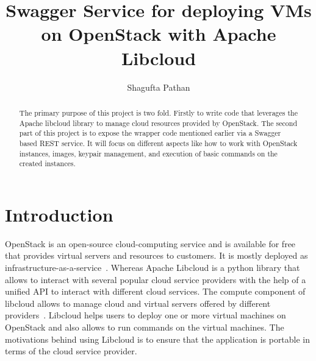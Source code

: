 
\title{Swagger Service for deploying VMs on OpenStack with Apache Libcloud}


\author{Shagufta Pathan}

\renewcommand{\shortauthors}{Shagufta}


\begin{abstract}
The primary purpose of this project is two fold. Firstly to write code that
leverages the Apache libcloud library to manage cloud resources provided by
OpenStack. The second part of this project is to expose the wrapper code
mentioned earlier via a Swagger based REST service. It will focus on different
aspects like how to work with OpenStack instances, images, keypair management,
and execution of basic commands on the created instances.
\end{abstract}


\maketitle

\section{Introduction}
OpenStack is an open-source cloud-computing service and is available for free
that provides virtual servers and resources to customers. It is mostly deployed
as infrastructure-as-a-service~\cite{hid-sp18-516-www-openstack}. Whereas Apache
Libcloud is a python library that allows to interact with several popular cloud
service providers with the help of a unified API to interact with different
cloud services. The compute component of libcloud allows to manage cloud and
virtual servers offered by different providers~\cite{hid-sp18-516-www-libcloud}.
Libcloud helps users to deploy one or more virtual machines on OpenStack and
also allows to run commands on the virtual machines. The motivations behind
using Libcloud is to ensure that the application is portable in terms of the
cloud service provider. 

